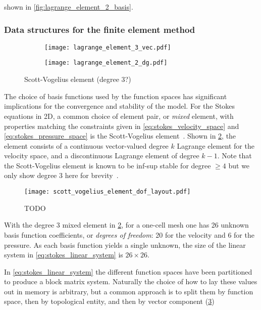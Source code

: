 \documentclass[thesis]{subfiles}
\begin{document}
shown in \cref{fig:lagrange_element_2_basis}.

\subsubsection{Data structures for the finite element method}

\begin{figure}
  \centering
  \hfill
  \begin{subfigure}{.4\textwidth}
    \texttt{[image: lagrange\_element\_3\_vec.pdf]}
    \label{fig:scott_vogelius_element_P3}
  \end{subfigure}
  \hfill
  \begin{subfigure}{.4\textwidth}
    \texttt{[image: lagrange\_element\_2\_dg.pdf]}
  \end{subfigure}
  \hfill
  \caption{Scott-Vogelius element (degree 3?)}
  \label{fig:scott_vogelius_element}
\end{figure}

The choice of basis functions used by the function spaces has significant implications for the convergence and stability of the model.
For the Stokes equations in 2D, a common choice of element pair, or \textit{mixed} element, with properties matching the constraints given in \cref{eq:stokes_velocity_space} and \cref{eq:stokes_pressure_space} is the Scott-Vogelius element~\cite{scottNormEstimatesMaximal1985}.
Shown in \cref{fig:scott_vogelius_element}, the element consists of a continuous vector-valued degree $k$ Lagrange element for the velocity space, and a discontinuous Lagrange element of degree $k-1$.
Note that the Scott-Vogelius element is known to be inf-sup stable for degree $\geq 4$ but we only show degree 3 here for brevity~\cite{guzmanScottVogeliusFiniteElements2018}.

\begin{figure}
  \centering
  \texttt{[image: scott\_vogelius\_element\_dof\_layout.pdf]}
  \caption{TODO}
  \label{fig:scott_vogelius_element_dof_layout}
\end{figure}

With the degree 3 mixed element in \cref{fig:scott_vogelius_element}, for a one-cell mesh one has 26 unknown basis function coefficients, or \textit{degrees of freedom}: 20 for the velocity and 6 for the pressure.
As each basis function yields a single unknown, the size of the linear system in \cref{eq:stokes_linear_system} is $26 \times 26$.

In \cref{eq:stokes_linear_system} the different function spaces have been partitioned to produce a block matrix system.
Naturally the choice of how to lay these values out in memory is arbitrary, but a common approach is to split them by function space, then by topological entity, and then by vector component (\cref{fig:scott_vogelius_element_dof_layout})
\end{document}

